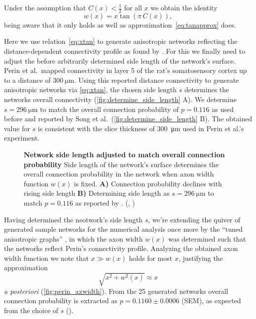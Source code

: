 Under the assumption that $C(x)<\frac{1}{2}$ for all $x$ we obtain the
identity
\begin{equation}
  w(x) = x \tan\left( \pi\, C(x) \right), \label{eq:xtan}
\end{equation} 
being aware that it only holds as well as
approximation~\ref{eq:tanapprox} does. 

Here we use relation~\ref{eq:xtan} to generate anisotropic networks
reflecting the dis\-tance-de\-pendent connectivity profile as found by
\textcite{Perin2011}. For this we finally need to adjust the before
arbitrarily determined side length of the network's surface. Perin et
al.~mapped connectivity in layer 5 of the rat's somatosensory cortex
up to a distance of $\SI{300}{\micro\meter}$. Using this reported
distance connectivity to generate anisotropic networks via
\ref{eq:xtan}, the chosen side length $s$ determines the networks
overall connectivity (\autoref{fig:determine_side_length} A). We
determine $s = \SI{296}{\micro\meter}$ to match the overall connection
probability of $p = 0.116$ as used before and reported by Song et
al.~(\autoref{fig:determine_side_length} B). The obtained value for
$s$ is consistent with the slice thickness of \SI{300}{\micro\meter}
used in Perin et al.'s experiment.


\begin{figure}[htp]
  \centering
  \captionsetup{skip=7pt}
  \caption{\textbf{Network side length adjusted to match overall
      connection probability} Side length of the network's surface
    determines the overall connection probability in the network when
    axon width function $w(x)$ is fixed. \textbf{A)} Connection
    probability declines with rising side length \textbf{B)}
    Determining side length as $s=\SI{296}{\micro\meter}$ to match $p
    = 0.116$ as reported by \textcite{Song2005}. (,
    )}
  \label{fig:determine_side_length}
\end{figure}



Having determined the neotwork's side length $s$, we're extending the
quiver of generated sample networks for the numerical analysis once
more by the \enquote{tuned anisotropic graphs} , in which the axon width $w(x)$ was determined
such that the networks reflect Perin's connectivity profile. Analyzing
the obtained axon width function we note that $x \gg w(x)$ holds for
most $x$, justifying the approximation
\[\sqrt{x^2 + w^2(x)} \approx
x\] \textit{a posteriori} (\autoref{fig:perin_axwidth}). From the 25
generated networks overall connection probability is extracted as $p
= 0.1160 \pm 0.0006$ (SEM), as expected from the choice of $s$ ().



